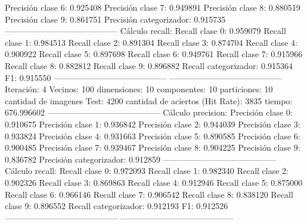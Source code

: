 Precisión clase 6: 0.925408
Precisión clase 7: 0.949891
Precisión clase 8: 0.880519
Precisión clase 9: 0.861751
Precisión categorizador: 0.915735
-----------------------------------------
Cálculo recall: 
Recall clase 0: 0.959079
Recall clase 1: 0.984513
Recall clase 2: 0.891304
Recall clase 3: 0.874704
Recall clase 4: 0.900922
Recall clase 5: 0.897698
Recall clase 6: 0.949761
Recall clase 7: 0.915966
Recall clase 8: 0.882812
Recall clase 9: 0.896882
Recall categorizador: 0.915364
F1: 0.915550
-----------------------------------------
-----------------------------------------
Iteración: 4
Vecinos: 100
dimensiones: 10
componentes: 10
particiones: 10
cantidad de imagenes Test: 4200
cantidad de aciertos (Hit Rate): 3835
tiempo: 676.996602
-----------------------------------------
Cálculo precision: 
Precisión clase 0: 0.910675
Precisión clase 1: 0.936842
Precisión clase 2: 0.944039
Precisión clase 3: 0.933824
Precisión clase 4: 0.931663
Precisión clase 5: 0.890585
Precisión clase 6: 0.900485
Precisión clase 7: 0.939467
Precisión clase 8: 0.904225
Precisión clase 9: 0.836782
Precisión categorizador: 0.912859
-----------------------------------------
Cálculo recall: 
Recall clase 0: 0.972093
Recall clase 1: 0.982340
Recall clase 2: 0.902326
Recall clase 3: 0.869863
Recall clase 4: 0.912946
Recall clase 5: 0.875000
Recall clase 6: 0.966146
Recall clase 7: 0.906542
Recall clase 8: 0.838120
Recall clase 9: 0.896552
Recall categorizador: 0.912193
F1: 0.912526
-----------------------------------------
-----------------------------------------
